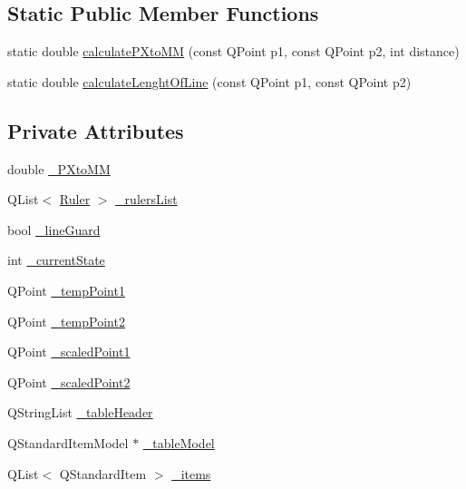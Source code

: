 \subsection*{Static Public Member Functions}
\begin{DoxyCompactItemize}
\item 
static double \mbox{\hyperlink{classLinesClass_a7b00d7bf8c4c9b96d643c2299c52ea62}{calculate\+P\+Xto\+MM}} (const Q\+Point p1, const Q\+Point p2, int distance)
\item 
static double \mbox{\hyperlink{classLinesClass_ad8ab0bbd2b5482724948b04eba86d2f2}{calculate\+Lenght\+Of\+Line}} (const Q\+Point p1, const Q\+Point p2)
\end{DoxyCompactItemize}
\subsection*{Private Attributes}
\begin{DoxyCompactItemize}
\item 
double \mbox{\hyperlink{classLinesClass_a6869ce06b3b8f1ff0bc85f323f6b6ee5}{\+\_\+\+P\+Xto\+MM}}
\item 
Q\+List$<$ \mbox{\hyperlink{classRuler}{Ruler}} $>$ \mbox{\hyperlink{classLinesClass_a433f7193cb50a8372c7c02289b0416d8}{\+\_\+rulers\+List}}
\item 
bool \mbox{\hyperlink{classLinesClass_a8ab6e5a5c6a794c5cfbc1dc0dea60c1e}{\+\_\+line\+Guard}}
\item 
int \mbox{\hyperlink{classLinesClass_a223a0a0577e6b9c026d8fd6df1b7ac3d}{\+\_\+current\+State}}
\item 
Q\+Point \mbox{\hyperlink{classLinesClass_ae6dfe8a03b4d94cc17486f4020b6ad5e}{\+\_\+temp\+Point1}}
\item 
Q\+Point \mbox{\hyperlink{classLinesClass_a6c65dce259446985fdd0c97525e55642}{\+\_\+temp\+Point2}}
\item 
Q\+Point \mbox{\hyperlink{classLinesClass_aaac1333fecbdb6682e43e6d2bfdcb4b3}{\+\_\+scaled\+Point1}}
\item 
Q\+Point \mbox{\hyperlink{classLinesClass_ab9573e0491994cddee75df125e66d037}{\+\_\+scaled\+Point2}}
\item 
Q\+String\+List \mbox{\hyperlink{classLinesClass_affcc1952d16f79fc9f4815c66e8302f2}{\+\_\+table\+Header}}
\item 
Q\+Standard\+Item\+Model $\ast$ \mbox{\hyperlink{classLinesClass_adbe970f0f58c2a517cb1997df551f864}{\+\_\+table\+Model}}
\item 
Q\+List$<$ Q\+Standard\+Item $>$ \mbox{\hyperlink{classLinesClass_af7ec7c1514700f3bab268d3179f259e1}{\+\_\+items}}
\end{DoxyCompactItemize}


